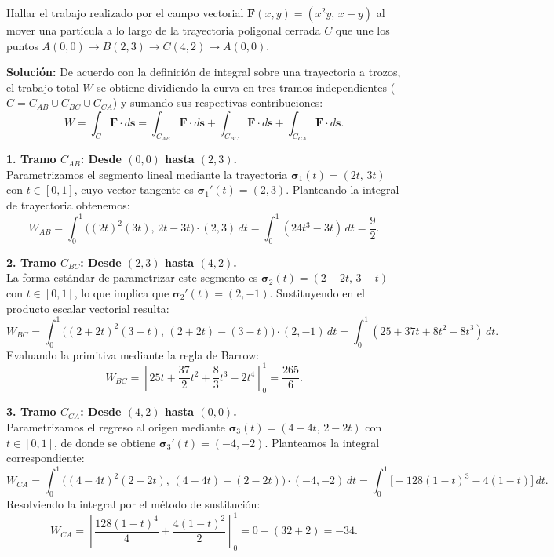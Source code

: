 \begin{example}\label{ej:trabajo_poligonal}
Hallar el trabajo realizado por el campo vectorial $\mathbf{F}(x,y) = (x^2y,\, x-y)$ al mover una partícula a lo largo de la trayectoria poligonal cerrada $C$ que une los puntos $A(0,0) \to B(2,3) \to C(4,2) \to A(0,0)$.
\end{example}

\begin{figure}[htbp]
    \centering
     
    \label{fig:ilustracion ejemplo}
\end{figure}


\noindent\textbf{Solución:} De acuerdo con la definición de integral sobre una trayectoria a trozos, el trabajo total $W$ se obtiene dividiendo la curva en tres tramos independientes ($C = C_{AB} \cup C_{BC} \cup C_{CA}$) y sumando sus respectivas contribuciones: 
\[ 
W = \int_{C} \mathbf{F} \cdot d\mathbf{s} = \int_{C_{AB}} \mathbf{F} \cdot d\mathbf{s} + \int_{C_{BC}} \mathbf{F} \cdot d\mathbf{s} + \int_{C_{CA}} \mathbf{F} \cdot d\mathbf{s}. 
\] 

\noindent\textbf{1. Tramo $C_{AB}$: Desde $(0,0)$ hasta $(2,3)$.} \\ 
Parametrizamos el segmento lineal mediante la trayectoria $\boldsymbol{\sigma}_1(t) = (2t,\, 3t)$ con $t\in[0,1]$, cuyo vector tangente es $\boldsymbol{\sigma}_1'(t) = (2, 3)$. Planteando la integral de trayectoria obtenemos:
\[ 
W_{AB} = \int_0^1 \bigl( (2t)^2(3t) ,\, 2t-3t \bigr) \cdot (2,3) \,dt = \int_0^1 (24t^3 - 3t)\,dt = \frac{9}{2}. 
\] 

\noindent\textbf{2. Tramo $C_{BC}$: Desde $(2,3)$ hasta $(4,2)$.} \\ 
La forma estándar de parametrizar este segmento es $\boldsymbol{\sigma}_2(t) = (2+2t,\, 3-t)$ con $t\in[0,1]$, lo que implica que $\boldsymbol{\sigma}_2'(t) = (2, -1)$. Sustituyendo en el producto escalar vectorial resulta:
\[ 
W_{BC} = \int_0^1 \bigl( (2+2t)^2 (3-t) ,\, (2+2t)-(3-t) \bigr) \cdot (2,-1) \,dt = \int_0^1 (25 + 37t + 8t^2 - 8t^3)\,dt.
\] 
Evaluando la primitiva mediante la regla de Barrow:
\[
W_{BC} = \left[25t + \frac{37}{2}t^2 + \frac{8}{3}t^3 - 2t^4\right]_0^1 = \frac{265}{6}. 
\]

\noindent\textbf{3. Tramo $C_{CA}$: Desde $(4,2)$ hasta $(0,0)$.} \\ 
Parametrizamos el regreso al origen mediante $\boldsymbol{\sigma}_3(t) = (4-4t,\, 2-2t)$ con $t\in[0,1]$, de donde se obtiene $\boldsymbol{\sigma}_3'(t) = (-4, -2)$. Planteamos la integral correspondiente:
\[ 
W_{CA} = \int_0^1 \bigl( (4-4t)^2 (2-2t) ,\, (4-4t)-(2-2t) \bigr) \cdot (-4,-2) \,dt = \int_0^1 \bigl[-128(1-t)^3 - 4(1-t)\bigr]\,dt.
\] 
Resolviendo la integral por el método de sustitución:
\[
W_{CA} = \left[\frac{128(1-t)^4}{4} + \frac{4(1-t)^2}{2}\right]_0^1 = 0 - (32 + 2) = -34. 
\]

